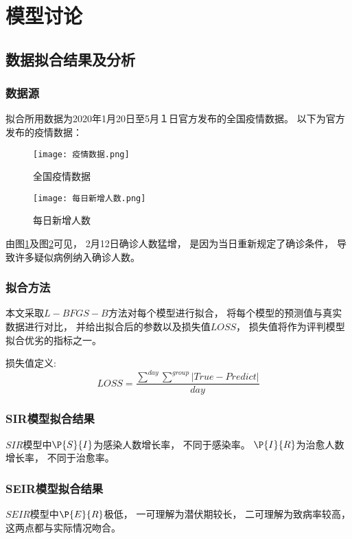 \section{模型讨论}
\subsection{数据拟合结果及分析}
\subsubsection{数据源}
\par 拟合所用数据为2020年1月20日至5月１日官方发布的全国疫情数据。
以下为官方发布的疫情数据：
\begin{figure}[H]
    \centering
    \texttt{[image: 疫情数据.png]}
    \caption{全国疫情数据\label{figure:全国疫情数据}}
\end{figure}
\begin{figure}[H]
    \centering
    \texttt{[image: 每日新增人数.png]}
    \caption{每日新增人数\label{figure:每日新增人数}}
\end{figure}
\par
由图\ref{figure:全国疫情数据}及图\ref{figure:每日新增人数}可见，
2月12日确诊人数猛增，
是因为当日重新规定了确诊条件，
导致许多疑似病例纳入确诊人数。
\subsubsection{拟合方法}
\par 本文采取$L-BFGS-B$方法对每个模型进行拟合，
将每个模型的预测值与真实数据进行对比，
并给出拟合后的参数以及损失值$LOSS$，
损失值将作为评判模型拟合优劣的指标之一。
\par 损失值定义:
\begin{equation}
    LOSS = \frac{\sum\limits^{day}\sum\limits^{group}
        \left|True-Predict\right|}{day}
\end{equation}
\subsubsection{SIR模型拟合结果}
\par $SIR$模型中$\P{S}{I}$为感染人数增长率，
不同于感染率。
$\P{I}{R}$为治愈人数增长率，
不同于治愈率。
\subsubsection{SEIR模型拟合结果}
\par $SEIR$模型中$\P{E}{R}$极低，
一可理解为潜伏期较长，
二可理解为致病率较高，
这两点都与实际情况吻合。
